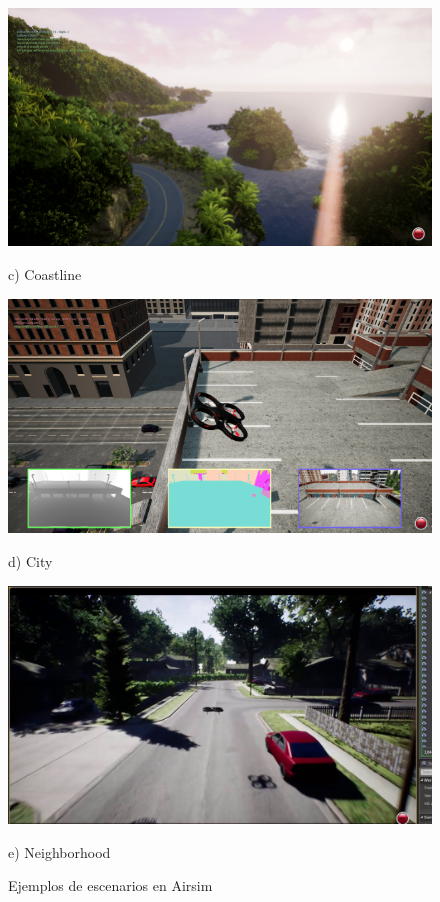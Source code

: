 \begin{figure}[H]
  \begin{minipage}{0.45\textwidth}
      \centering
      \includegraphics[width=\linewidth]{figs/Plataformas_Desarollo/mapas_airsim/Coastline.png}
      \caption*{c) Coastline}
  \end{minipage}%
  \begin{minipage}{0.45\textwidth}
      \centering
      \includegraphics[width=\linewidth]{figs/Plataformas_Desarollo/mapas_airsim/city_airsim.png}
      \caption*{d) City}
  \end{minipage}

  \begin{minipage}{0.45\textwidth}
      \centering
      \includegraphics[width=\linewidth]{figs/Plataformas_Desarollo/mapas_airsim/AirsimNH.jpg}
      \caption*{e) Neighborhood}
  \end{minipage}
  \caption{Ejemplos de escenarios en Airsim}
  \label{f:escenarios_airsim}
  \vspace{-1.5em}
\end{figure}


